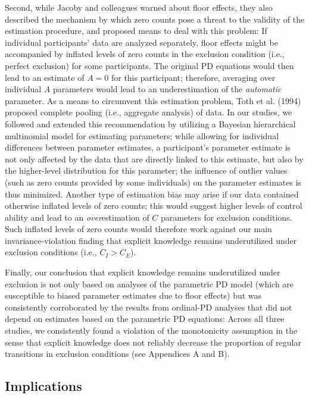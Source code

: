 \documentclass[man]{apa6}
\theoremstyle{definition}
\theoremstyle{definition}
\theoremstyle{definition}
\theoremstyle{remark}
\begin{document}
Second, while Jacoby and colleagues warned about floor effects, they
also described the mechanism by which zero counts pose a threat to the
validity of the estimation procedure, and proposed means to deal with
this problem: If individual participants' data are analyzed separately,
floor effects might be accompanied by inflated levels of zero counts in
the exclusion condition (i.e., perfect exclusion) for some participants.
The original PD equations would then lead to an estimate of \(A=0\) for
this participant; therefore, averaging over individual \(A\) parameters
would lead to an underestimation of the \emph{automatic} parameter. As a
means to circumvent this estimation problem, Toth et al. (1994) proposed
complete pooling (i.e., aggregate analysis) of data. In our studies, we
followed and extended this recommendation by utilizing a Bayesian
hierarchical multinomial model for estimating parameters; while allowing
for individual differences between parameter estimates, a participant's
parameter estimate is not only affected by the data that are directly
linked to this estimate, but also by the higher-level distribution for
this parameter; the influence of outlier values (such as zero counts
provided by some individuals) on the parameter estimates is thus
minimized. Another type of estimation bias may arise if our data
contained otherwise inflated levels of zero counts; this would suggest
higher levels of control ability and lead to an \emph{over}estimation of
\(C\) parameters for exclusion conditions. Such inflated levels of zero
counts would therefore work against our main invariance-violation
finding that explicit knowledge remains underutilized under exclusion
conditions (i.e., \(C_I > C_E\)).

Finally, our conclusion that explicit knowledge remains underutilized
under exclusion is not only based on analyses of the parametric PD model
(which are susceptible to biased parameter estimates due to floor
effects) but was consistently corroborated by the results from
ordinal-PD analyses that did not depend on estimates based on the
parametric PD equations: Across all three studies, we consistently found
a violation of the monotonicity assumption in the sense that explicit
knowledge does not reliably decrease the proportion of regular
transitions in exclusion conditions (see Appendices A and B).

\subsection{Implications}\label{implications}
\end{document}
